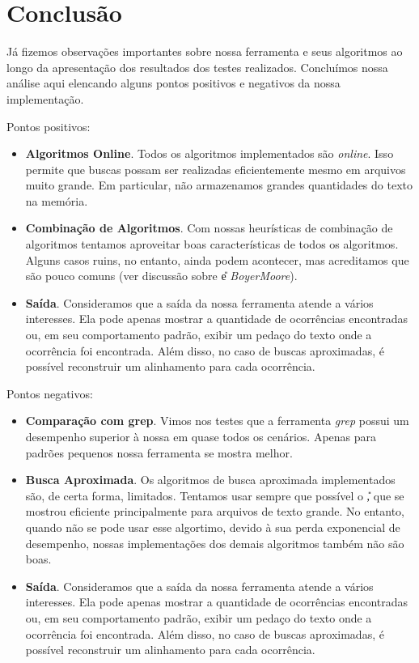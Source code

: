 \documentclass[]{article}
\begin{document}
\section{Conclusão}

Já fizemos observações importantes sobre nossa ferramenta e seus algoritmos ao longo da apresentação dos resultados dos testes realizados. Concluímos nossa análise aqui elencando alguns pontos positivos e negativos da nossa implementação.

Pontos positivos:
\begin{itemize}
	\item \textbf{Algoritmos Online}. Todos os algoritmos implementados são \textit{online}. Isso permite que buscas possam ser realizadas eficientemente mesmo em arquivos muito grande. Em particular, não armazenamos grandes quantidades do texto na memória.

	\item \textbf{Combinação de Algoritmos}. Com nossas heurísticas de combinação de algoritmos tentamos aproveitar boas características de todos os algoritmos. Alguns casos ruins, no entanto, ainda podem acontecer, mas acreditamos que são pouco comuns (ver discussão sobre \U e \textit{BoyerMoore}).

	\item \textbf{Saída}. Consideramos que a saída da nossa ferramenta atende a vários interesses. Ela pode apenas mostrar a quantidade de ocorrências encontradas ou, em seu comportamento padrão, exibir um pedaço do texto onde a ocorrência foi encontrada. Além disso, no caso de buscas aproximadas, é possível reconstruir um alinhamento para cada ocorrência.
\end{itemize}

Pontos negativos:
\begin{itemize}
	\item \textbf{Comparação com grep}. Vimos nos testes que a ferramenta \textit{grep} possui um desempenho superior à nossa em quase todos os cenários. Apenas para padrões pequenos nossa ferramenta se mostra melhor.

	\item \textbf{Busca Aproximada}. Os algoritmos de busca aproximada implementados são, de certa forma, limitados. Tentamos usar sempre que possível o \U, que se mostrou eficiente principalmente para arquivos de texto grande. No entanto, quando não se pode usar esse algortimo, devido à sua perda exponencial de desempenho, nossas implementações dos demais algoritmos também não são boas.

	\item \textbf{Saída}. Consideramos que a saída da nossa ferramenta atende a vários interesses. Ela pode apenas mostrar a quantidade de ocorrências encontradas ou, em seu comportamento padrão, exibir um pedaço do texto onde a ocorrência foi encontrada. Além disso, no caso de buscas aproximadas, é possível reconstruir um alinhamento para cada ocorrência.
\end{itemize}
\end{document}
